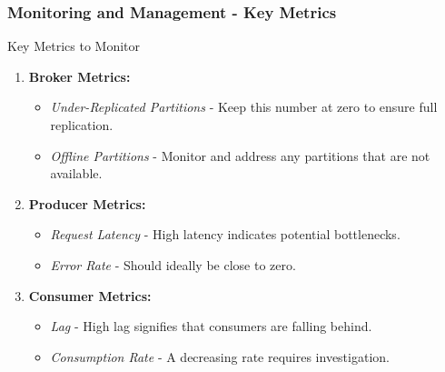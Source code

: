 \documentclass[aspectratio=169]{beamer}
\begin{document}
\begin{frame}[fragile]
  \frametitle{Monitoring and Management - Key Metrics}
  \begin{block}{Key Metrics to Monitor}
    \begin{enumerate}
      \item \textbf{Broker Metrics:}
        \begin{itemize}
          \item \textit{Under-Replicated Partitions} - Keep this number at zero to ensure full replication.
          \item \textit{Offline Partitions} - Monitor and address any partitions that are not available.
        \end{itemize}
      
      \item \textbf{Producer Metrics:}
        \begin{itemize}
          \item \textit{Request Latency} - High latency indicates potential bottlenecks.
          \item \textit{Error Rate} - Should ideally be close to zero.
        \end{itemize}
      
      \item \textbf{Consumer Metrics:}
        \begin{itemize}
          \item \textit{Lag} - High lag signifies that consumers are falling behind.
          \item \textit{Consumption Rate} - A decreasing rate requires investigation.
        \end{itemize}
    \end{enumerate}
  \end{block}
\end{frame}
\end{document}
